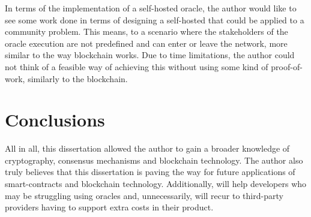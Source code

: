 In terms of the implementation of a self-hosted oracle, the author would like to see some work done in terms of designing a self-hosted that could be applied to a community problem. This means, to a scenario where the stakeholders of the oracle execution are not predefined and can enter or leave the network, more similar to the way blockchain works. Due to time limitations, the author could not think of a feasible way of achieving this without using some kind of proof-of-work, similarly to the blockchain.


\section{Conclusions}

All in all, this dissertation allowed the author to gain a broader knowledge of cryptography, consensus mechanisms and blockchain technology. The author also truly believes that this dissertation is paving the way for future applications of smart-contracts and blockchain technology. Additionally, will help developers who may be struggling using oracles and, unnecessarily, will recur to third-party providers having to support extra costs in their product.